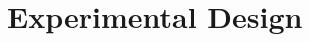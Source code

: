\documentclass{article}
\begin{document}












\section{Experimental Design}\label{sec:method}
\end{document}
